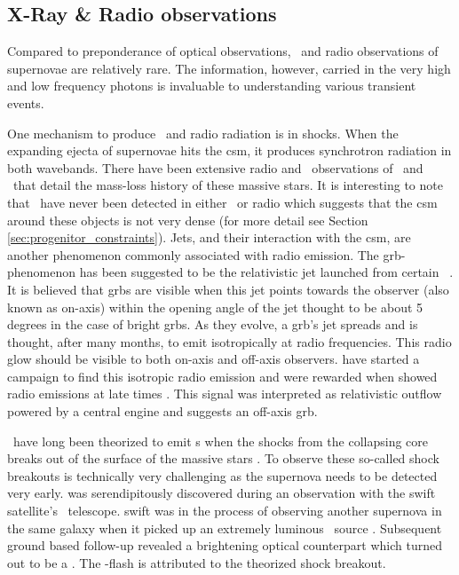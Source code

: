 \subsection{X-Ray \& Radio observations}

Compared to preponderance of optical observations, \xray\ and radio observations of supernovae are relatively rare. The information, however, carried in the very high and low frequency photons is invaluable to understanding various transient events. 

One mechanism to produce \xray\ and radio radiation is in shocks. When the expanding ejecta of supernovae hits the \gls{csm}, it produces synchrotron radiation in both wavebands. There have been extensive radio and \xray\ observations of \sneii\ and \sneibc\ that detail the mass-loss history of these massive stars. It is interesting to note that \sneia\ have never been detected in either \xray\ or radio which suggests that the \gls{csm} around these objects is not very dense (for more detail see Section \ref{sec:progenitor_constraints}). Jets, and their interaction with the \gls{csm}, are another phenomenon commonly associated with radio emission. The \gls{grb}-phenomenon has been suggested to be the relativistic jet launched from certain \snibc\ \citep[e.g.][]{2010AIPC.1279..171U}. It is believed that \glspl{grb} are visible when this jet points towards the observer (also known as on-axis) within the opening angle of the jet thought to be about 5 degrees in the case of bright \glspl{grb}. As they evolve, a \gls{grb}'s jet spreads and is thought, after many months, to emit isotropically at radio frequencies. This radio glow should be visible to both on-axis and off-axis observers. \cite{2006ApJ...638..930S} have started a campaign to find this isotropic radio emission and were rewarded when  showed radio emissions at late times  \citep{2010Natur.463..513S}. This signal was interpreted as relativistic outflow powered by a central engine and suggests an off-axis \gls{grb}.

\sneiiibc\ have long been theorized to emit \xray s when the shocks from the collapsing core breaks out of the surface of the massive stars \citep{1978ApJ...223L.109K,1974ApJ...187..333C}. To observe these so-called shock breakouts is technically very challenging as the supernova needs to be detected very early.  was serendipitously discovered during an observation with the \gls{swift} satellite's \xray\ telescope. \gls{swift} was in the process of observing another supernova  in the same galaxy when it picked up an extremely luminous \xray\ source \citep{2008Natur.453..469S}. Subsequent ground based follow-up revealed a brightening optical counterpart which turned out to be a \snibc. The \xray-flash is attributed to the theorized shock breakout.

